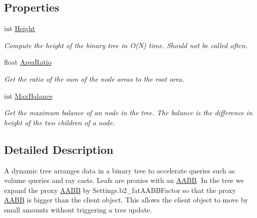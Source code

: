 \subsection*{Properties}
\begin{DoxyCompactItemize}
\item 
int \hyperlink{class_farseer_physics_1_1_collision_1_1_dynamic_tree_3_01_t_01_4_aa6edeb5506f3a8230b02241f7ede0e7c}{Height}
\begin{DoxyCompactList}\small\item\em Compute the height of the binary tree in O(\+N) time. Should not be called often. \end{DoxyCompactList}\item 
float \hyperlink{class_farseer_physics_1_1_collision_1_1_dynamic_tree_3_01_t_01_4_a2a23067e5e5136926d4c32ee27da09b9}{Area\+Ratio}
\begin{DoxyCompactList}\small\item\em Get the ratio of the sum of the node areas to the root area. \end{DoxyCompactList}\item 
int \hyperlink{class_farseer_physics_1_1_collision_1_1_dynamic_tree_3_01_t_01_4_ac53449e098d2d8012465ee88f3ce3385}{Max\+Balance}
\begin{DoxyCompactList}\small\item\em Get the maximum balance of an node in the tree. The balance is the difference in height of the two children of a node. \end{DoxyCompactList}\end{DoxyCompactItemize}


\subsection{Detailed Description}
A dynamic tree arranges data in a binary tree to accelerate queries such as volume queries and ray casts. Leafs are proxies with an \hyperlink{struct_farseer_physics_1_1_collision_1_1_a_a_b_b}{A\+A\+B\+B}. In the tree we expand the proxy \hyperlink{struct_farseer_physics_1_1_collision_1_1_a_a_b_b}{A\+A\+B\+B} by Settings.\+b2\+\_\+fat\+A\+A\+B\+B\+Factor so that the proxy \hyperlink{struct_farseer_physics_1_1_collision_1_1_a_a_b_b}{A\+A\+B\+B} is bigger than the client object. This allows the client object to move by small amounts without triggering a tree update. 

